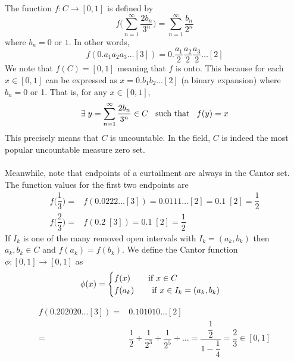 \begin{defi}
The function $f:C\rightarrow [0,1]$ is defined by
\[f\Big(\sum _{n=1}^{\infty }\dfrac{2b_{n}}{3^{n}}\Big)=\sum ^{\infty }_{n=1}\dfrac{b_{n}}{2^{n}}\]
where $b_{n}=0$ or $1$. In other words,
\[f (0.a_1a_2a_3\ldots[3] )=0.\dfrac{a_1}{2}\dfrac{a_2}{2}\dfrac{a_3}{2}\ldots [2]\]
We note that $f (C)=[0,1]$ meaning that $f$ is onto. This because for each $x\in [0,1]$ can be expressed as $x=0.b_1b_2\ldots [2]$ (a binary expansion) where $b_{n}=0$ or 1. That is, for any $x\in [0,1]$,
\[\exists \;y=\sum ^{\infty }_{n=1}\dfrac{2b_{n}}{3^{n}}\in C\hspace{2ex}\mathrm{such\ that}\hspace{2ex}f (y)=x\]
This precisely means that $C$ is uncountable. In the field, $C$ is indeed the most popular uncountable measure zero set. 
\\\\
Meanwhile, note that endpoints of a curtailment are always in the Cantor set. The function values for the first two endpoints are 
\begin{align*}
	f \Big(\dfrac{1}{3}\Big)=&f (0.0222\ldots [3])=0.0111\ldots [2]=0.1\;[2]=\dfrac{1}{2}\\
	f \Big(\dfrac{2}{3}\Big)=&f(0.2\;[3])=0.1\;[2]=\dfrac{1}{2}
\end{align*}
If $I_{k}$ is one of the many removed open intervals with $I_{k}=(a_{k},b_{k})$ then $a_{k},b_{k}\in C$ and $f(a_{k})=f(b_{k})$. We define the Cantor function $\phi :[0,1]\rightarrow [0,1]$ as
\[\phi (x)=\begin{cases}
f (x)\hspace{5ex}\mathrm{if}\;x\in C\\
f (a_{k})\hspace{5ex}\mathrm{if}\;x\in I_{k}=(a_{k},b_{k})
\end{cases}\]
\end{defi}
\vspace{2ex}
\begin{ex}
\begin{align*}
	f  (0.202020\ldots [3])=&0.101010\ldots [2]\\
	=&\dfrac{1}{2}+\dfrac{1}{2^3}+\dfrac{1}{2^{5}}+\ldots =\dfrac{\dfrac{1}{2}}{1-\dfrac{1}{4}}=\dfrac{2}{3}\in [0,1]
\end{align*}
\end{ex}
\vspace{2ex}
